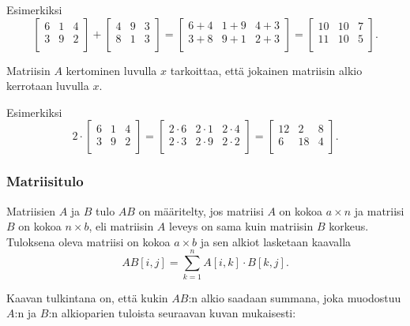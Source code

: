 Esimerkiksi
\[
 \begin{bmatrix}
  6 & 1 & 4 \\
  3 & 9 & 2 \\
 \end{bmatrix}
+
 \begin{bmatrix}
  4 & 9 & 3 \\
  8 & 1 & 3 \\
 \end{bmatrix}
=
 \begin{bmatrix}
  6+4 & 1+9 & 4+3 \\
  3+8 & 9+1 & 2+3 \\
 \end{bmatrix}
=
 \begin{bmatrix}
  10 & 10 & 7 \\
  11 & 10 & 5 \\
 \end{bmatrix}.
\]

Matriisin $A$ kertominen luvulla $x$ tarkoittaa,
että jokainen matriisin alkio kerrotaan luvulla $x$.

Esimerkiksi
\[
 2 \cdot \begin{bmatrix}
  6 & 1 & 4 \\
  3 & 9 & 2 \\
 \end{bmatrix}
=
 \begin{bmatrix}
  2 \cdot 6 & 2\cdot1 & 2\cdot4 \\
  2\cdot3 & 2\cdot9 & 2\cdot2 \\
 \end{bmatrix}
=
 \begin{bmatrix}
  12 & 2 & 8 \\
  6 & 18 & 4 \\
 \end{bmatrix}.
\]


\subsubsection{Matriisitulo}

Matriisien $A$ ja $B$ tulo $AB$ on määritelty,
jos matriisi $A$ on kokoa $a \times n$
ja matriisi $B$ on kokoa $n \times b$,
eli matriisin $A$ leveys on sama kuin matriisin
$B$ korkeus.
Tuloksena oleva matriisi
on kokoa $a \times b$
ja sen alkiot lasketaan kaavalla
\[
AB[i,j] = \sum_{k=1}^n A[i,k] \cdot B[k,j].
\]

Kaavan tulkintana on, että kukin $AB$:n alkio
saadaan summana, joka muodostuu $A$:n ja
$B$:n alkioparien tuloista seuraavan
kuvan mukaisesti:

